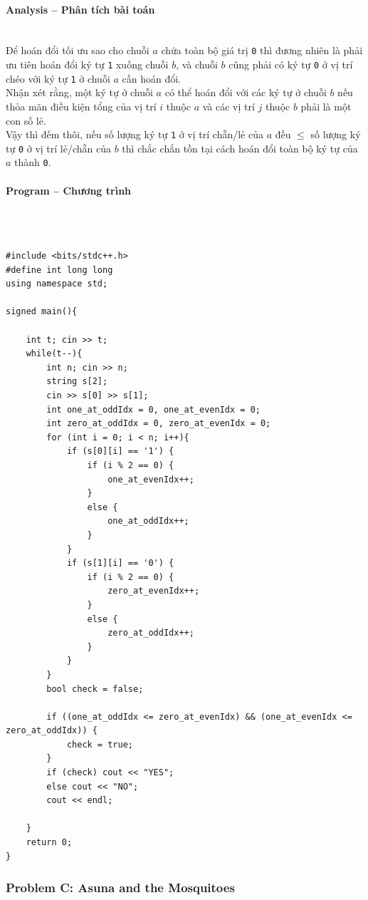 \documentclass{article}
\begin{document}
\paragraph{Analysis -- Phân tích bài toán} \mbox{} \\

Để hoán đổi tối ưu sao cho chuỗi $a$ chứa toàn bộ giá trị \texttt{0} thì đương nhiên là phải ưu tiên hoán đổi ký tự \texttt{1} xuống chuỗi $b$, và chuỗi $b$ cũng phải có ký tự \texttt{0} ở vị trí chéo với ký tự \texttt{1} ở chuỗi $a$ cần hoán đổi.\\

Nhận xét rằng, một ký tự ở chuỗi $a$ có thể hoán đổi với các ký tự ở chuỗi $b$ nếu thỏa mãn điều kiện tổng của vị trí $i$ thuộc $a$ và các vị trí $j$ thuộc $b$ phải là một con số lẻ.\\

Vậy thì đếm thôi, nếu số lượng ký tự \texttt{1} ở vị trí chẵn/lẻ của $a$ đều $\leq$ số lượng ký tự \texttt{0} ở vị trí lẻ/chẵn của $b$ thì chắc chắn tồn tại cách hoán đổi toàn bộ ký tự của $a$ thành \texttt{0}.

\paragraph{Program -- Chương trình} \mbox{} \\

\begin{lstlisting}

#include <bits/stdc++.h>
#define int long long
using namespace std;

signed main(){

	int t; cin >> t;
	while(t--){
		int n; cin >> n;
		string s[2];
		cin >> s[0] >> s[1];
		int one_at_oddIdx = 0, one_at_evenIdx = 0;
		int zero_at_oddIdx = 0, zero_at_evenIdx = 0;
		for (int i = 0; i < n; i++){
			if (s[0][i] == '1') {
				if (i % 2 == 0) {
					one_at_evenIdx++;
				}
				else {
					one_at_oddIdx++;
				}
			}
			if (s[1][i] == '0') {
				if (i % 2 == 0) {
					zero_at_evenIdx++;
				}
				else {
					zero_at_oddIdx++;
				}
			}
		}
		bool check = false;

		if ((one_at_oddIdx <= zero_at_evenIdx) && (one_at_evenIdx <= zero_at_oddIdx)) {
			check = true;
		}
		if (check) cout << "YES";
		else cout << "NO";
		cout << endl;

	}
	return 0;
}
\end{lstlisting}

\subsubsection{Problem C: Asuna and the Mosquitoes}
\end{document}
